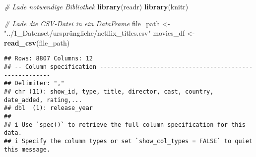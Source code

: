 \documentclass[
]{article}
\author{}
\date{\vspace{-2.5em}}
\newenvironment{Shaded}{\begin{snugshade}}{\end{snugshade}}
\newcommand{\CommentTok}[1]{\textcolor[rgb]{0.56,0.35,0.01}{\textit{#1}}}
\newcommand{\FunctionTok}[1]{\textcolor[rgb]{0.13,0.29,0.53}{\textbf{#1}}}
\newcommand{\NormalTok}[1]{#1}
\newcommand{\OtherTok}[1]{\textcolor[rgb]{0.56,0.35,0.01}{#1}}
\newcommand{\StringTok}[1]{\textcolor[rgb]{0.31,0.60,0.02}{#1}}
\begin{document}
\begin{Shaded}
\begin{Highlighting}[]
\CommentTok{\# Lade notwendige Bibliothek}
\FunctionTok{library}\NormalTok{(readr)}
\FunctionTok{library}\NormalTok{(knitr)}

\CommentTok{\# Lade die CSV{-}Datei in ein DataFrame}
\NormalTok{file\_path }\OtherTok{\textless{}{-}} \StringTok{"../1\_Datenset/ursprüngliche/netflix\_titles.csv"}
\NormalTok{movies\_df }\OtherTok{\textless{}{-}} \FunctionTok{read\_csv}\NormalTok{(file\_path)}
\end{Highlighting}
\end{Shaded}

\begin{verbatim}
## Rows: 8807 Columns: 12
## -- Column specification --------------------------------------------------------
## Delimiter: ","
## chr (11): show_id, type, title, director, cast, country, date_added, rating,...
## dbl  (1): release_year
## 
## i Use `spec()` to retrieve the full column specification for this data.
## i Specify the column types or set `show_col_types = FALSE` to quiet this message.
\end{verbatim}
\end{document}
